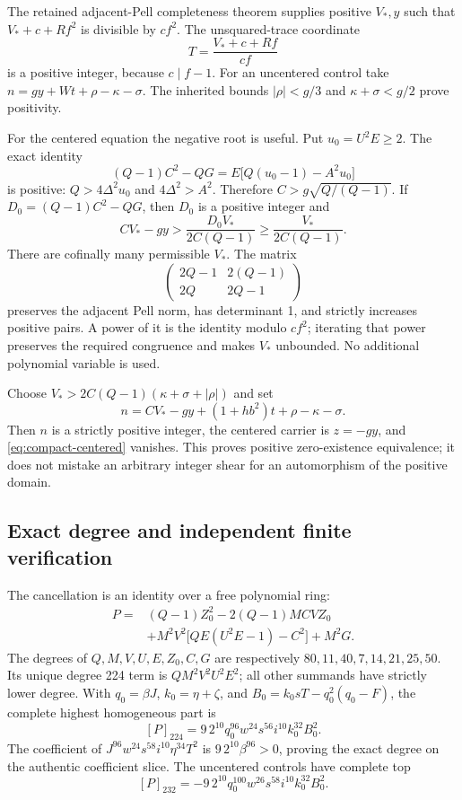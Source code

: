The retained adjacent-Pell completeness theorem supplies positive
\(V_*,y\) such that \(V_*+c+Rf^2\) is divisible by \(cf^2\).
The unsquared-trace coordinate
\[
T=\frac{V_*+c+Rf}{cf}
\]
is a positive integer, because \(c\mid f-1\).  For an uncentered
control take \(n=gy+Wt+\rho-\kappa-\sigma\).  The inherited bounds
\(|\rho|<g/3\) and \(\kappa+\sigma<g/2\) prove positivity.

For the centered equation the negative root is useful.  Put
\(u_0=U^2E\ge2\).  The exact identity
\[
(Q-1)C^2-QG=E\bigl[Q(u_0-1)-A^2u_0\bigr]
\]
is positive: \(Q>4\Delta^2u_0\) and \(4\Delta^2>A^2\).
Therefore \(C>g\sqrt{Q/(Q-1)}\).  If
\(D_0=(Q-1)C^2-QG\), then \(D_0\) is a positive integer and
\[
CV_*-gy>\frac{D_0V_*}{2C(Q-1)}\ge\frac{V_*}{2C(Q-1)}.
\]
There are cofinally many permissible \(V_*\).  The matrix
\[
\begin{pmatrix}2Q-1&2(Q-1)\\2Q&2Q-1\end{pmatrix}
\]
preserves the adjacent Pell norm, has determinant 1, and strictly
increases positive pairs.  A power of it is the identity modulo
\(cf^2\); iterating that power preserves the required congruence and
makes \(V_*\) unbounded.  No additional polynomial variable is used.

Choose \(V_*>2C(Q-1)(\kappa+\sigma+|\rho|)\) and set
\[
n=CV_*-gy+(1+hb^2)t+\rho-\kappa-\sigma.
\]
Then \(n\) is a strictly positive integer, the centered carrier is
\(z=-gy\), and \eqref{eq:compact-centered} vanishes.  This proves
positive zero-existence equivalence; it does not mistake an arbitrary
integer shear for an automorphism of the positive domain.

\subsection{Exact degree and independent finite verification}

The cancellation is an identity over a free polynomial ring:
\begin{align*}
P={}&(Q-1)Z_0^2-2(Q-1)MCVZ_0\\
&+M^2V^2\bigl[QE(U^2E-1)-C^2\bigr]+M^2G.
\end{align*}
The degrees of \(Q,M,V,U,E,Z_0,C,G\) are respectively
\(80,11,40,7,14,21,25,50\).  Its unique degree 224 term is
\(QM^2V^2U^2E^2\); all other summands have strictly lower degree.
With \(q_0=\beta J\), \(k_0=\eta+\zeta\), and
\(B_0=k_0sT-q_0^2(q_0-F)\), the complete highest homogeneous part is
\[
[P]_{224}=9\,2^{10}q_0^{96}w^{24}s^{56}i^{10}k_0^{32}B_0^2.
\]
The coefficient of
\(J^{96}w^{24}s^{58}i^{10}\eta^{34}T^2\) is
\(9\,2^{10}\beta^{96}>0\), proving the exact degree on the authentic
coefficient slice.  The uncentered controls have complete top
\[
[P]_{232}=-9\,2^{10}q_0^{100}w^{26}s^{58}i^{10}k_0^{32}B_0^2.
\]

